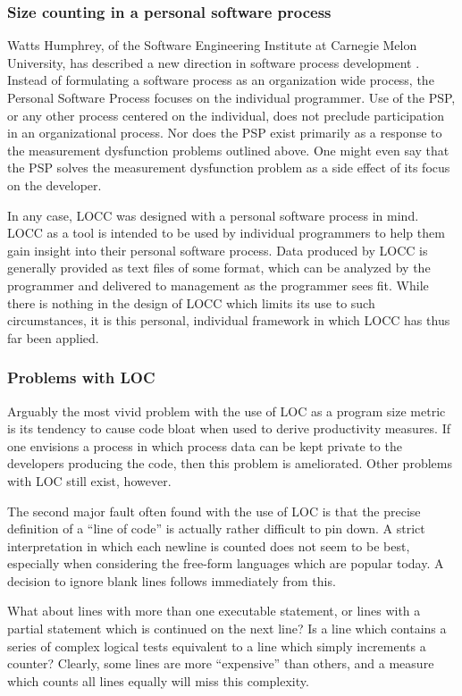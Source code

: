 \subsubsection{Size counting in a personal software process}

Watts Humphrey, of the Software Engineering Institute at Carnegie Melon
University, has described a new direction in software process development
\cite{Humphrey}.  Instead of formulating a software process as an
organization wide process, the Personal Software Process focuses on the
individual programmer.  Use of the PSP, or any other process centered on
the individual, does not preclude participation in an organizational
process.  Nor does the PSP exist primarily as a response to the measurement
dysfunction problems outlined above.  One might even say that the PSP
solves the measurement dysfunction problem as a side effect of its focus on
the developer.

In any case, LOCC was designed with a personal software process in
mind.  LOCC as a tool is intended to be used by individual
programmers to help them gain insight into their personal software
process.  Data produced by LOCC is generally provided as text files of 
some format, which can be analyzed by the programmer and delivered to
management as the programmer sees fit.  While there is nothing in the
design of LOCC which limits its use to such circumstances, it is this
personal, individual framework in which LOCC has thus far been applied.

\subsubsection{Problems with LOC}

Arguably the most vivid problem with the use of LOC as a program size metric
is its tendency to cause code bloat when used to derive productivity
measures.  If one envisions a process in which process data can be
kept private to the developers producing the code, then this problem
is ameliorated.  Other problems with LOC still exist, however.

The second major fault often found with the use of LOC is that the
precise definition of a ``line of code'' is actually rather difficult
to pin down.  A strict interpretation in which each newline is counted 
does not seem to be best, especially when considering the free-form
languages which are popular today.  A decision to ignore blank
lines follows immediately from this.

What about lines with more than one executable statement, or lines
with a partial statement which is continued on the next line?  Is a
line which contains a series of complex logical tests equivalent to a
line which simply increments a counter?  Clearly, some lines are more
``expensive'' than others, and a measure which counts all lines
equally will miss this complexity.  

